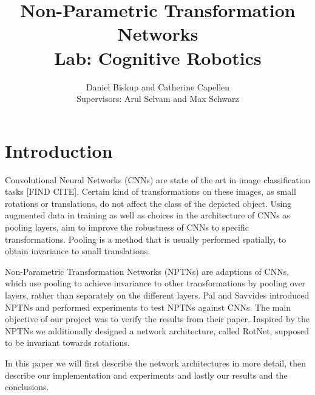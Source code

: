 \documentclass{llncs}
\begin{document}
\pagestyle{headings}  %
%
\mainmatter              %
%
\title{Non-Parametric Transformation Networks \\Lab: Cognitive Robotics}
%
%  
%
\author{Daniel Biskup and Catherine Capellen
 \\Supervisors: Arul Selvam and Max Schwarz}
%
%
%

\maketitle              %
\section{Introduction}
Convolutional Neural Networks (CNNs) are state of the art in image classification tasks [FIND CITE]. Certain kind of transformations on these images, as small rotations or translations, do not affect the class of the depicted object.  
Using augmented data in training as well as choices in the architecture of CNNs as pooling layers, aim to improve the robustness of CNNs to specific transformations. 
Pooling is a method that is usually performed spatially, to obtain invariance to small translations. 

Non-Parametric Transformation Networks (NPTNs) are adaptions of CNNs, which use pooling to achieve invariance to other transformations by pooling over layers, rather than separately on the different layers.
Pal and Savvides \cite{NPTN18} introduced NPTNs and performed experiments to test NPTNs against CNNs. The main objective of our project was to verify the results from their paper. 
Inspired by the NPTNs we additionally designed a network architecture, called RotNet, supposed to be invariant towards rotations.

In this paper we will first describe the network architectures in more detail, then describe our implementation and experiments and lastly our results and the conclusions.
\end{document}
